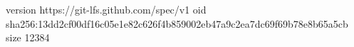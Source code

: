 version https://git-lfs.github.com/spec/v1
oid sha256:13dd2cf00df16c05e1e82c626f4b859002eb47a9c2ea7dc69f69b78e8b65a5cb
size 12384
